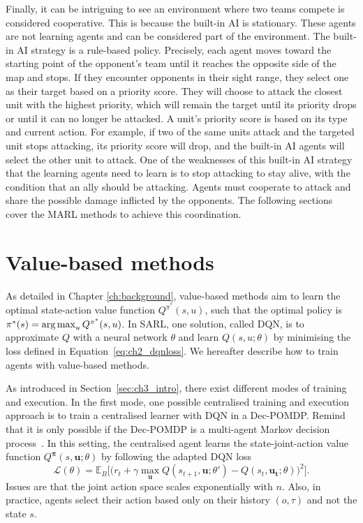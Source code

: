 Finally, it can be intriguing to see an environment where two teams compete is considered cooperative.
This is because the built-in AI is stationary. 
These agents are not learning agents and can be considered part of the environment.
The built-in AI strategy is a rule-based policy.
Precisely, each agent moves toward the starting point of the opponent's team until it reaches the opposite side of the map and stops.
If they encounter opponents in their sight range, they select one as their target based on a priority score.
They will choose to attack the closest unit with the highest priority, which will remain the target until its priority drops or until it can no longer be attacked.
A unit's priority score is based on its type and current action.
For example, if two of the same units attack and the targeted unit stops attacking, its priority score will drop, and the built-in AI agents will select the other unit to attack.
One of the weaknesses of this built-in AI strategy that the learning agents need to learn is to stop attacking to stay alive, with the condition that an ally should be attacking.
Agents must cooperate to attack and share the possible damage inflicted by the opponents.
The following sections cover the MARL methods to achieve this coordination.

\section{Value-based methods}
\label{sec:ch3_value}

As detailed in Chapter \ref{ch:background}, value-based methods aim to learn the optimal state-action value function $Q^{\pi^*}(s, u)$, such that the optimal policy is $\pi^*(s)=\operatorname*{arg\,max}_{u} Q^{\pi^*}(s, u)$.
In SARL, one solution, called DQN, is to approximate $Q$ with a neural network $\theta$ and learn $Q(s, u;\theta)$
by minimising the loss defined in Equation~\ref{eq:ch2_dqnloss}.
We hereafter describe how to train agents with value-based methods.

As introduced in Section~\ref{sec:ch3_intro}, there exist different modes of training and execution.
In the first mode, one possible centralised training and execution approach is to train a centralised learner with DQN in a Dec-POMDP.
Remind that it is only possible if the Dec-POMDP is a multi-agent Markov decision process~\citep{boutilier1996planning}.
In this setting, the centralised agent learns the state-joint-action value function $Q^{\mathbf{\pi}}(s,\mathbf{u}; \theta)$ by following the adapted DQN loss
\begin{equation}
\label{eq:ch3_centralQloss}
    \mathcal{L}(\theta) = \mathbb{E}_{B} \big[\big(r_{t} + \gamma \max_{\mathbf{u}} Q(s_{t+1}, \mathbf{u}; \theta')- Q(s_{t}, \mathbf{\mathbf{u_t}}; \theta)\big)^{2}\big].
\end{equation}
Issues are that the joint action space scales exponentially with $n$.
Also, in practice, agents select their action based only on their history $(o, \tau)$ and not the state $s$.

